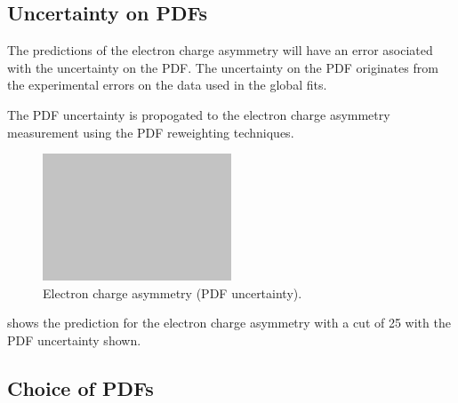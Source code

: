 \subsection{Uncertainty on \acp{PDF}}

The predictions of the electron charge asymmetry will have an error asociated
with the uncertainty on the \ac{PDF}.
The uncertainty on the \ac{PDF} originates from the experimental errors on the
data used in the global fits.

The \ac{PDF} uncertainty is propogated to the electron charge asymmetry
measurement using the \ac{PDF} reweighting techniques\cite{}.

\begin{figure}[htb]
  \centering
  \includegraphics[width=0.5\textwidth]{placeholder}
  \caption{Electron charge asymmetry (PDF uncertainty).}
  \label{wbos:asym_pdfuncert}
\end{figure}

 shows the prediction for the electron charge
asymmetry with a \PT cut of \unit{25}{\GeV} with the \ac{PDF} uncertainty shown.




\subsection{Choice of \acp{PDF}}


